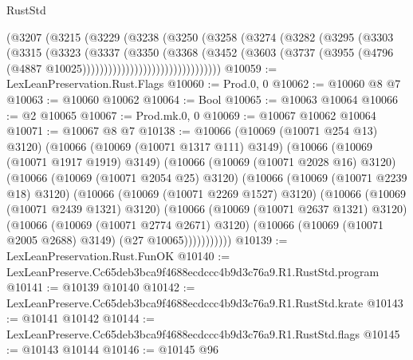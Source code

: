 \begin{lexlean}{RustStd}
\begin{coremodule}
                          (@3207
                            (@3215
                              (@3229
                                (@3238
                                  (@3250
                                    (@3258
                                      (@3274
                                        (@3282
                                          (@3295
                                            (@3303
                                              (@3315
                                                (@3323
                                                  (@3337
                                                    (@3350
                                                      (@3368
                                                        (@3452
                                                          (@3603
                                                            (@3737
                                                              (@3955
                                                                (@4796
                                                                  (@4887
                                                                    @10025))))))))))))))))))))))))))))))))
@10059 := LexLeanPreservation.Rust.Flags
@10060 := Prod.{0, 0}
@10062 := @10060 @8 @7
@10063 := @10060 @10062
@10064 := Bool
@10065 := @10063 @10064
@10066 := @2 @10065
@10067 := Prod.mk.{0, 0}
@10069 := @10067 @10062 @10064
@10071 := @10067 @8 @7
@10138 := @10066
    (@10069 (@10071 @254 @13) @3120)
    (@10066
      (@10069 (@10071 @1317 @111) @3149)
      (@10066
        (@10069 (@10071 @1917 @1919) @3149)
        (@10066
          (@10069 (@10071 @2028 @16) @3120)
          (@10066
            (@10069 (@10071 @2054 @25) @3120)
            (@10066
              (@10069 (@10071 @2239 @18) @3120)
              (@10066
                (@10069 (@10071 @2269 @1527) @3120)
                (@10066
                  (@10069 (@10071 @2439 @1321) @3120)
                  (@10066
                    (@10069 (@10071 @2637 @1321) @3120)
                    (@10066
                      (@10069 (@10071 @2774 @2671) @3120)
                      (@10066 (@10069 (@10071 @2005 @2688) @3149) (@27 @10065)))))))))))
@10139 := LexLeanPreservation.Rust.FunOK
@10140 := LexLeanPreserve.Cc65deb3bca9f4688ecdccc4b9d3c76a9.R1.RustStd.program
@10141 := @10139 @10140
@10142 := LexLeanPreserve.Cc65deb3bca9f4688ecdccc4b9d3c76a9.R1.RustStd.krate
@10143 := @10141 @10142
@10144 := LexLeanPreserve.Cc65deb3bca9f4688ecdccc4b9d3c76a9.R1.RustStd.flags
@10145 := @10143 @10144
@10146 := @10145 @96

\end{coremodule}
\end{lexlean}
